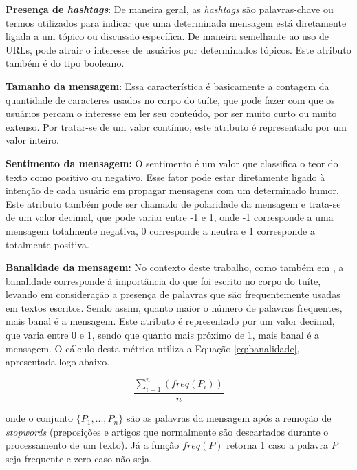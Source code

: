 \documentclass[oneside,openright,12pt]{ufsm_2015} %
\begin{document}
    \par \textbf{Presença de \textit{hashtags}}: De maneira geral, as \textit{hashtags} são palavras-chave ou termos utilizados para indicar que uma determinada mensagem está diretamente ligada a um tópico ou discussão específica. De maneira semelhante ao uso de URLs, pode atrair o interesse de usuários por determinados tópicos. Este atributo também é do tipo booleano.

    \par \textbf{Tamanho da mensagem}: Essa característica é basicamente a contagem da quantidade de caracteres usados no corpo do tuíte, que pode fazer com que os usuários percam o interesse em ler seu conteúdo, por ser muito curto ou muito extenso. Por tratar-se de um valor contínuo, este atributo é representado por um valor inteiro.

    \par \textbf{Sentimento da mensagem:} O sentimento é um valor que classifica o teor do texto como positivo ou negativo. Esse fator pode estar diretamente ligado à intenção de cada usuário em propagar mensagens com um determinado humor. Este atributo também pode ser chamado de polaridade da mensagem e trata-se de um valor decimal, que pode variar entre -1 e 1, onde -1 corresponde a uma mensagem totalmente negativa, 0 corresponde a neutra e 1 corresponde a totalmente positiva.

    \par \textbf{Banalidade da mensagem:} No contexto deste trabalho, como também em \cite{artigo:oliveira:18}, a banalidade corresponde à importância do que foi escrito no corpo do tuíte, levando em consideração a presença de palavras que são frequentemente usadas em textos escritos. Sendo assim, quanto maior o número de palavras frequentes, mais banal é a mensagem. Este atributo é representado por um valor decimal, que varia entre 0 e 1, sendo que quanto mais próximo de 1, mais banal é a mensagem. O cálculo desta métrica utiliza a Equação \ref{eq:banalidade}, apresentada logo abaixo.

    \begin{equation} \label{eq:banalidade}
    \frac{\sum_{i=1}^n (freq(P_i))}{n}
    \end{equation}
    
    \par onde o conjunto $\{P_1, ..., P_n\}$ são as palavras da mensagem após a remoção de \textit{stopwords} (preposições e artigos que normalmente são descartados durante o processamento de um texto). Já a função $freq(P)$ retorna 1 caso a palavra $P$ seja frequente e zero caso não seja.
\end{document}
